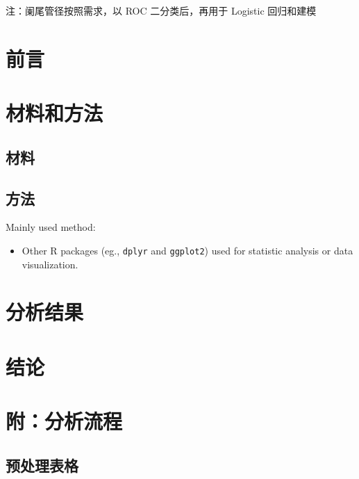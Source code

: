 \documentclass[
]{article}
\providecommand{\tightlist}{%
  \setlength{\itemsep}{0pt}\setlength{\parskip}{0pt}}
\begin{document}
注：阑尾管径按照需求，以 ROC 二分类后，再用于 Logistic 回归和建模

\hypertarget{introduction}{%
\section{前言}\label{introduction}}

\hypertarget{methods}{%
\section{材料和方法}\label{methods}}

\hypertarget{ux6750ux6599}{%
\subsection{材料}\label{ux6750ux6599}}

\hypertarget{ux65b9ux6cd5}{%
\subsection{方法}\label{ux65b9ux6cd5}}

Mainly used method:

\begin{itemize}
\tightlist
\item
  Other R packages (eg., \texttt{dplyr} and \texttt{ggplot2}) used for statistic analysis or data visualization.
\end{itemize}

\hypertarget{results}{%
\section{分析结果}\label{results}}

\hypertarget{dis}{%
\section{结论}\label{dis}}

\hypertarget{workflow}{%
\section{附：分析流程}\label{workflow}}

\hypertarget{ux9884ux5904ux7406ux8868ux683c}{%
\subsection{预处理表格}\label{ux9884ux5904ux7406ux8868ux683c}}
\end{document}
